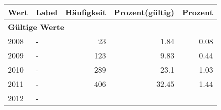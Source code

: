      \begin{longtable}{lXrrr}
     \toprule
     \textbf{Wert} & \textbf{Label} & \textbf{Häufigkeit} & \textbf{Prozent(gültig)} & \textbf{Prozent} \\
     \endhead
     \midrule
     \multicolumn{5}{l}{\textbf{Gültige Werte}}\\

     2008 &
     \multicolumn{1}{X}{ -  } &


       \num{23} &
       \num[round-mode=places,round-precision=2]{1.84} &
         \num[round-mode=places,round-precision=2]{0.08} \\

     2009 &
     \multicolumn{1}{X}{ -  } &


       \num{123} &
       \num[round-mode=places,round-precision=2]{9.83} &
         \num[round-mode=places,round-precision=2]{0.44} \\

     2010 &
     \multicolumn{1}{X}{ -  } &


       \num{289} &
       \num[round-mode=places,round-precision=2]{23.1} &
         \num[round-mode=places,round-precision=2]{1.03} \\

     2011 &
     \multicolumn{1}{X}{ -  } &


       \num{406} &
       \num[round-mode=places,round-precision=2]{32.45} &
         \num[round-mode=places,round-precision=2]{1.44} \\

     2012 &
     \multicolumn{1}{X}{ -  } &



\end{longtable}
